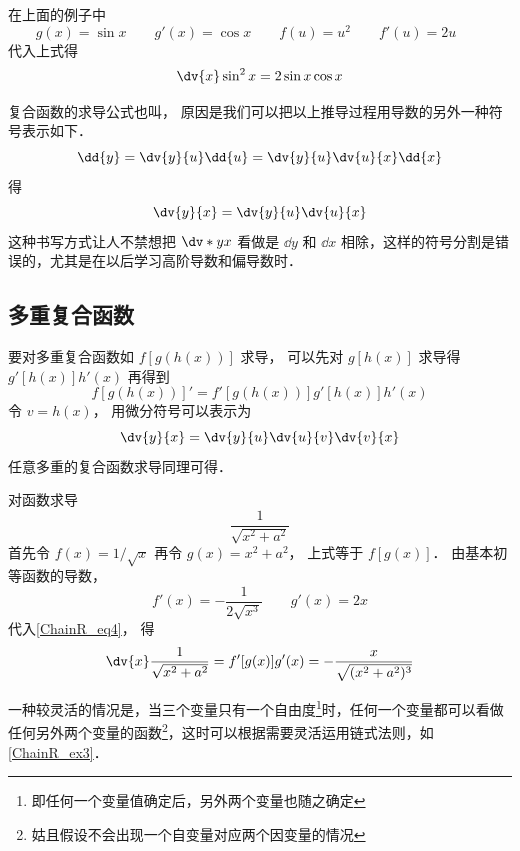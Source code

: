 在上面的例子中 
\begin{equation}
g(x) = \sin x \qquad
g'(x) = \cos x \qquad %
f(u) = u^2 \qquad
f'(u) = 2u \qquad
\end{equation}
代入上式得
\begin{equation}
\dv{x} \sin^2 x = 2\sin x \cos x
\end{equation}

复合函数的求导公式也叫， 原因是我们可以把以上推导过程用导数的另外一种符号表示如下．
\begin{equation}
\dd{y} = \dv{y}{u} \dd{u} = \dv{y}{u} \dv{u}{x} \dd{x}
\end{equation}
得
\begin{equation}
\dv{y}{x} = \dv{y}{u} \dv{u}{x}
\end{equation}
这种书写方式让人不禁想把 $\dv*{y}{x}$ 看做是 $\dd{y}$ 和 $\dd{x}$ 相除，这样的符号分割是错误的，尤其是在以后学习高阶导数和偏导数时．%

\subsection{多重复合函数}
要对多重复合函数如 $f[g(h(x))]$ 求导， 可以先对 $g[h(x)]$ 求导得 $g'[h(x)]h'(x)$ 再得到
\begin{equation}
f[g(h(x))]' = f'[g(h(x))]g'[h(x)]h'(x)
\end{equation}
令 $v = h(x)$， 用微分符号可以表示为
\begin{equation}
\dv{y}{x} = \dv{y}{u}\dv{u}{v}\dv{v}{x}
\end{equation}
任意多重的复合函数求导同理可得．

\begin{example}{对函数求导}
\begin{equation}
\frac{1}{\sqrt{x^2+a^2}}
\end{equation}
首先令 $f(x) = 1/\sqrt{x}$ 再令 $g(x) = x^2+a^2$， 上式等于 $f[g(x)]$． 由基本初等函数的导数，
\begin{equation}
f'(x) = -\frac{1}{2\sqrt{x^3}}  \qquad g'(x) = 2x
\end{equation}
代入\autoref{ChainR_eq4}， 得
\begin{equation}
\dv{x} \frac{1}{\sqrt{x^2+a^2}} =  f'[g(x)] g'(x) = -\frac{x}{\sqrt{(x^2+a^2)^3}}
\end{equation}
\end{example}

一种较灵活的情况是，当三个变量只有一个自由度\footnote{即任何一个变量值确定后，另外两个变量也随之确定}时，任何一个变量都可以看做任何另外两个变量的函数\footnote{姑且假设不会出现一个自变量对应两个因变量的情况}，这时可以根据需要灵活运用链式法则，如\autoref{ChainR_ex3}．

